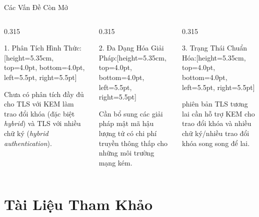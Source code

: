 \documentclass[aspectratio=169, 10pt]{beamer}
\begin{document}
\begin{frame}{Các Vấn Đề Còn Mở}
	\begin{columns}[T]
		\begin{column}{0.315\textwidth}
			\begin{accentcard}[uetblue]{1. Phân Tích Hình Thức:}[height=5.35cm, top=4.0pt, bottom=4.0pt, left=5.5pt, right=5.5pt]
				\raggedright\fontsize{6.2pt}{8.0pt}\selectfont
				Chưa có phân tích đầy đủ cho TLS với KEM làm trao đổi khóa (đặc biệt \textit{hybrid}) và TLS với nhiều chữ ký (\textit{hybrid authentication}).
			\end{accentcard}
		\end{column}

		\begin{column}{0.315\textwidth}
			\begin{accentcard}[uetblue]{2. Đa Dạng Hóa Giải Pháp:}[height=5.35cm, top=4.0pt, bottom=4.0pt, left=5.5pt, right=5.5pt]
				\raggedright\fontsize{6.2pt}{8.0pt}\selectfont
				Cần bổ sung các giải pháp mật mã hậu lượng tử có chi phí truyền thông thấp cho những môi trường mạng kém.
			\end{accentcard}
		\end{column}

		\begin{column}{0.315\textwidth}
			\begin{accentcard}[uetdarkgreen]{3. Trạng Thái Chuẩn Hóa:}[height=5.35cm, top=4.0pt, bottom=4.0pt, left=5.5pt, right=5.5pt]
				\raggedright\fontsize{6.2pt}{8.0pt}\selectfont
				phiên bản TLS tương lai cần hỗ trợ KEM cho trao đổi khóa và nhiều chữ ký/nhiều trao đổi khóa song song để lai.
			\end{accentcard}
		\end{column}
	\end{columns}
\end{frame}

\section{Tài Liệu Tham Khảo}
\end{document}
